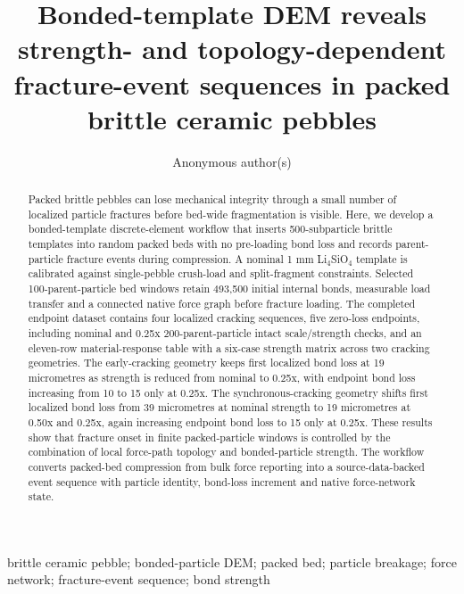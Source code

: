 \documentclass[preprint,12pt]{elsarticle}
\begin{document}
\begin{frontmatter}
\title{\texorpdfstring{Bonded-template DEM reveals strength- and topology-dependent fracture-event sequences in packed brittle ceramic pebbles}{Bonded-template DEM reveals strength- and topology-dependent fracture-event sequences in packed brittle ceramic pebbles}}
\author{Anonymous author(s)}










\begin{abstract}

Packed brittle pebbles can lose mechanical integrity through a small number of localized particle fractures before bed-wide fragmentation is visible. Here, we develop a bonded-template discrete-element workflow that inserts 500-subparticle brittle templates into random packed beds with no pre-loading bond loss and records parent-particle fracture events during compression. A nominal 1 mm Li$_4$SiO$_4$ template is calibrated against single-pebble crush-load and split-fragment constraints. Selected 100-parent-particle bed windows retain 493,500 initial internal bonds, measurable load transfer and a connected native force graph before fracture loading. The completed endpoint dataset contains four localized cracking sequences, five zero-loss endpoints, including nominal and 0.25x 200-parent-particle intact scale/strength checks, and an eleven-row material-response table with a six-case strength matrix across two cracking geometries. The early-cracking geometry keeps first localized bond loss at 19 micrometres as strength is reduced from nominal to 0.25x, with endpoint bond loss increasing from 10 to 15 only at 0.25x. The synchronous-cracking geometry shifts first localized bond loss from 39 micrometres at nominal strength to 19 micrometres at 0.50x and 0.25x, again increasing endpoint bond loss to 15 only at 0.25x. These results show that fracture onset in finite packed-particle windows is controlled by the combination of local force-path topology and bonded-particle strength. The workflow converts packed-bed compression from bulk force reporting into a source-data-backed event sequence with particle identity, bond-loss increment and native force-network state.


\end{abstract}

\begin{keyword}
brittle ceramic pebble; bonded-particle DEM; packed bed; particle breakage; force network; fracture-event sequence; bond strength
\end{keyword}
\end{frontmatter}
\end{document}

